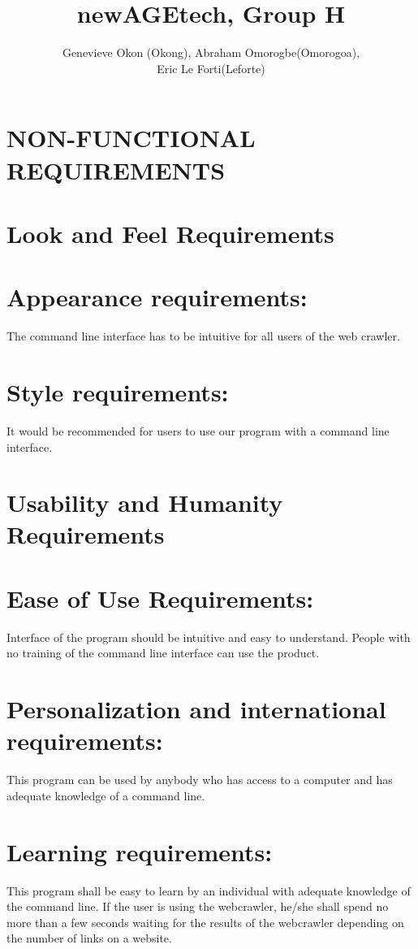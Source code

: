 \documentclass[12pt]{article}
\begin{document}
\title{newAGEtech, Group H }
\author{Genevieve Okon (Okong), Abraham Omorogbe(Omorogoa),\\
 Eric Le Forti(Leforte)}
\maketitle


\section*{NON-FUNCTIONAL REQUIREMENTS}

\section*{Look and Feel Requirements }

\section*{Appearance requirements:}  The command line interface has to be intuitive for all users of the web crawler.

\section*{Style requirements: }It would be recommended for users to use our program with a command line interface.

\section*{Usability and Humanity Requirements }

\section*{Ease of Use Requirements:} Interface of the program should be intuitive and easy to understand. People with no training of the command line interface can use the product.

\section*{Personalization and international requirements: }This program can be used by anybody who has access to a computer and has adequate knowledge of a command line.

\section*{Learning requirements:}  This program shall be easy to learn by an individual with adequate knowledge of the command line. If the user is using the webcrawler, he/she shall spend no more than a few seconds waiting for the results of the webcrawler depending on the number of links on a website.
\end{document}
